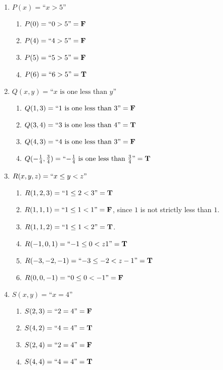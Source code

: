 \begin{solutions}
		\begin{enumerate}
		\item $P(x) = \textrm{``\(x > 5\)''}$
		\begin{enumerate}
			\item $P(0) = \textrm{``\(0 > 5\)''} = \textbf{\textrm{F}} $
			\item $P(4) = \textrm{``\(4 > 5\)''} = \textbf{\textrm{F}}$
			\item $P(5) = \textrm{``\(5 > 5\)''} = \textbf{\textrm{F}}$
			\item $P(6) = \textrm{``\(6 > 5\)''} = \textbf{\textrm{T}}$
		\end{enumerate}
		\item $Q(x,y) = \textrm{``\(x\) is one less than \(y\)''}$
		\begin{enumerate}
			\item $Q(1,3) = \textrm{``\(1\) is one less than \(3\)''} = \textbf{\textrm{F}}$
			\item $Q(3,4)= \textrm{``\(3\) is one less than \(4\)''} = \textbf{\textrm{T}}$
			\item $Q(4,3)= \textrm{``\(4\) is one less than \(3\)''} = \textbf{\textrm{F}}$
			\item $Q(-\frac{1}{4}, \frac{3}{4}) = \textrm{``\(-\frac{1}{4}\) is one less than \(\frac{3}{4}\)''} = \textbf{\textrm{T}}$
		\end{enumerate} 
		\item $R(x,y,z) = \textrm{``\( x \leq y < z\)''}$
		\begin{enumerate}
			\item $R(1,2,3)= \textrm{``\( 1 \leq 2 < 3\)''} = \textbf{\textrm{T}}$
			\item $R(1,1,1)= \textrm{``\( 1 \leq 1 < 1\)''} = \textbf{\textrm{F}}$, since $1$ is not strictly less than $1$.
			\item $R(1,1,2)= \textrm{``\( 1 \leq 1 < 2\)''} = \textbf{\textrm{T}}$.
			\item $R(-1,0,1)= \textrm{``\( -1 \leq 0 < z1\)''} = \textbf{\textrm{T}}$
			\item $R(-3,-2,-1)= \textrm{``\( -3 \leq -2 < z-1\)''} = \textbf{\textrm{T}}$
			\item $R(0,0,-1)= \textrm{``\( 0 \leq 0 < -1\)''} = \textbf{\textrm{F}}$
		\end{enumerate}
		\item $S(x,y) = \textrm{``\(x = 4\)''}$
		\begin{enumerate}
			\item $S(2,3) = \textrm{``\(2 = 4\)''} = \textbf{\textrm{F}}$
			\item $S(4,2) = \textrm{``\(4 = 4\)''} = \textbf{\textrm{T}}$
			\item $S(2,4) = \textrm{``\(2 = 4\)''} = \textbf{\textrm{F}}$
			\item $S(4,4) = \textrm{``\(4 = 4\)''} = \textbf{\textrm{T}}$
		\end{enumerate}
	\end{enumerate}
		
	\end{solutions}


